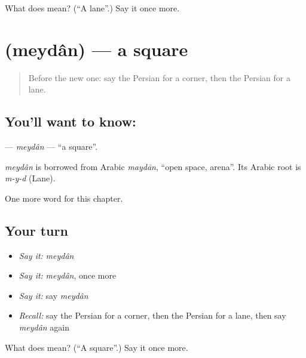 \begin{tcolorbox}[breakable,colback=teal!4,colframe=teal!35!black,title={Before you move on}]
What does  mean? (\textquotedblleft{}A lane\textquotedblright{}.) Say it once more.
\end{tcolorbox}
\section[\texorpdfstring{\fa{میدان} (meydân)}{میدان (meydân)}]{ (meydân) — a square}

\label{lesson:FA-C87-meydan}



\begin{quote}
Before the new one: say the Persian for a corner, then the Persian for a lane.
\end{quote}

\subsection*{You'll want to know: }
\textbf{} — \emph{meydân} — \textquotedblleft{}a square\textquotedblright{}.

\begin{cousinweb}
\emph{meydân} is borrowed from Arabic \emph{maydān}, \textquotedblleft{}open space, arena\textquotedblright{}. Its Arabic root is \emph{m-y-d} (Lane).
\end{cousinweb}

\begin{grammarlens}[title={What you've built}]
One more word for this chapter.
\end{grammarlens}

\subsection*{Your turn}
\begin{itemize}
\raggedright
  \item \emph{Say it:} \emph{meydân}
  \item \emph{Say it:} \emph{meydân}, once more
  \item \emph{Say it:} say \emph{meydân}
  \item \emph{Recall:} say the Persian for a corner, then the Persian for a lane, then say \emph{meydân} again
\end{itemize}

\begin{tcolorbox}[breakable,colback=teal!4,colframe=teal!35!black,title={Before you move on}]
What does  mean? (\textquotedblleft{}A square\textquotedblright{}.) Say it once more.
\end{tcolorbox}
